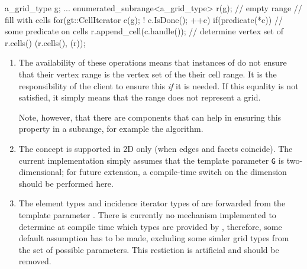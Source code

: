 \begin{example}
  a\_grid\_type g;
  ...
  enumerated\_subrange<a\_grid\_type>  r(g); // empty range
  // fill with cells
  for(gt::CellIterator c(g); ! c.IsDone(); ++c)
    if(predicate(*c)) // some predicate on cells
      r.append_cell(c.handle());
  // determine vertex set of r.cells()
  (r.cells(),%
(r));
  
\end{example}
\begin{enumerate}
\item {}
  The availability of these operations means that
  instances of  
  do not ensure that their 
  vertex range is the vertex set of the 
  their cell range.
  It is the responsibility of the client to ensure this 
  {\em if\/} it is needed.
  If this equality is not satisfied, it simply means that the range
  does not represent a  grid.

  Note, however, that there are components that can help in ensuring
  this property in a subrange, for example the 
   algorithm.

\item {}
  The   concept
  is supported in 2D only (when edges and facets coincide).
  The current implementation simply assumes that the template parameter
  {\tt G} is two-dimensional; for future extension, 
  a compile-time switch on the dimension should be performed here.
\item {}
  The element types and incidence iterator types of
    are forwarded from the template
   parameter . There is currently no mechanism implemented
   to determine at compile time which types are provided by ,
   therefore, some default assumption has to be made, excluding 
   some simler grid types from the set of possible parameters.
   This restiction is artificial and should be removed.
\end{enumerate}


 ~
 ~
